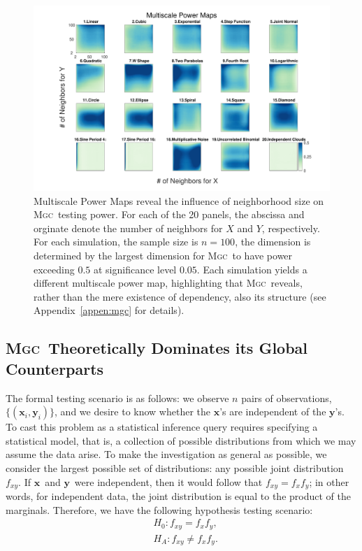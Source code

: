 \documentclass[11pt]{article}
\providecommand{\sct}[1]{{\normalfont\textsc{#1}}}
\providecommand{\mb}[1]{\boldsymbol{#1}}
\newcommand{\Mgc}{\sct{Mgc}}
\newcommand{\mbx}{\ensuremath{\mb{x}}}
\newcommand{\mby}{\ensuremath{\mb{y}}}
\begin{document}
\begin{figure}[htbp]
\includegraphics[width=1.0\textwidth]{../Figures/FigHDHeat}
\caption{Multiscale Power Maps reveal the influence of neighborhood size on \Mgc~testing power.
For each of the 20 panels, the abscissa and orginate denote the number of neighbors for $X$ and  $Y$, respectively. For each simulation, the sample size is $n=100$,  the dimension is determined by the largest dimension for \Mgc~to have power exceeding $0.5$ at significance level  $0.05$. Each simulation yields a different multiscale power map, highlighting that \Mgc~reveals, rather than the mere existence of dependency, also its  structure  (see Appendix~\ref{appen:mgc} for details).}
\label{f:powermaps}
\end{figure}


\subsection*{\Mgc~Theoretically Dominates its Global Counterparts}
\label{s:theory}

The formal testing scenario is as follows: we observe $n$ pairs of observations, $\{(\mb{x}_i,\mb{y}_i)\}$, and we desire to know whether the \mbx's are independent of the \mby's.  To cast this problem as a statistical inference query requires specifying a statistical model, that is, a collection of possible distributions from which we may assume the data arise.  To make the investigation as general as possible, we consider the largest possible set of distributions: any possible joint distribution $f_{xy}$. If \mbx~and \mby~were independent, then it would follow that $f_{xy}=f_x f_y$; in other words, for independent data, the joint distribution is equal to the product of the marginals.  Therefore, we have the following hypothesis testing scenario:
\begin{align*}
& H_{0}: f_{xy}=f_{x}f_{y},\\
& H_{A}: f_{xy} \neq f_{x}f_{y}.
\end{align*}
\end{document}

